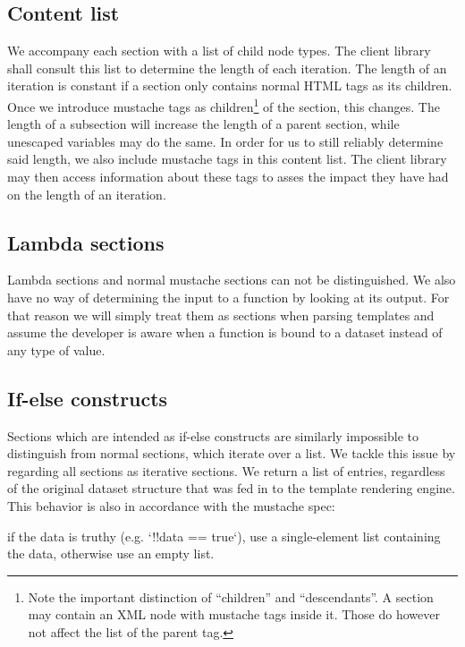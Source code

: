 \documentclass[thesis.tex]{subfiles}
\begin{document}
\subsection{Content list}
\label{sec:content-list}
We accompany each section with a list of child node types. The client library
shall consult this list to determine the length of each iteration.
The length of an iteration is constant if a section only contains normal
HTML tags as its children. Once we introduce mustache tags as
children\footnote{Note the important distinction of ``children'' and
	``descendants''.
	A section may contain an XML node with mustache tags inside it.
	Those do however not affect the  list of the parent tag.
} of the section, this changes.
The length of a subsection will increase the length of a parent section, while
unescaped variables may do the same.
In order for us to still reliably determine said length, we also include
mustache tags in this content list. The client library may then access
information about these tags to asses the impact they have had on the length of
an iteration.

\subsection{Lambda sections}
Lambda sections and normal mustache sections can not be distinguished.
We also have no way of determining the input to a function by looking at its
output. For that reason we will simply treat them as sections when parsing
templates and assume the developer is aware when a function is bound to a
dataset instead of any type of value.

\subsection{If-else constructs}
\label{sec:if-else}
Sections which are intended as if-else constructs are similarly impossible to
distinguish from normal sections, which iterate over a list. We tackle this
issue by regarding all sections as iterative sections. We return a list of
entries, regardless of the original dataset structure that was fed in to the
template rendering engine.
This behavior is also in accordance with the mustache spec:
\begin{citequote}{\cite[sections.yml]{MSTSPEC}}
	if the data is truthy (e.g. `!!data == true`), use a single-element list
	containing the data, otherwise use an empty list.
\end{citequote}
\end{document}
